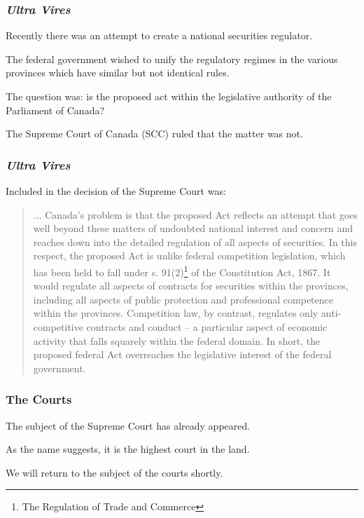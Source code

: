 \begin{frame}
\frametitle{\textit{Ultra Vires}}

Recently there was an attempt to create a national securities regulator.

The federal government wished to unify the regulatory regimes in the various provinces which have similar but not identical rules.

The question was: is the proposed act within the legislative authority of the Parliament of Canada?

The Supreme Court of Canada (SCC) ruled that the matter was not.

\end{frame}



\begin{frame}
\frametitle{\textit{Ultra Vires}}
Included in the decision of the Supreme Court was:
\begin{quote}
   ... Canada's problem is that the proposed Act reflects an attempt that goes well beyond these matters of undoubted national interest and concern and reaches down into the detailed regulation of all aspects of securities. In this respect, the proposed Act is unlike federal competition legislation, which has been held to fall under s. 91(2)\footnote{The Regulation of Trade and Commerce} of the Constitution Act, 1867. It would regulate all aspects of contracts for securities within the provinces, including all aspects of public protection and professional competence within the provinces. Competition law, by contrast, regulates only anti-competitive contracts and conduct -- a particular aspect of economic activity that falls squarely within the federal domain. In short, the proposed federal Act overreaches the legislative interest of the federal government.
\end{quote}
\end{frame}



\begin{frame}
\frametitle{The Courts}

The subject of the Supreme Court has already appeared.

As the name suggests, it is the highest court in the land.

We will return to the subject of the courts shortly.

\end{frame}



